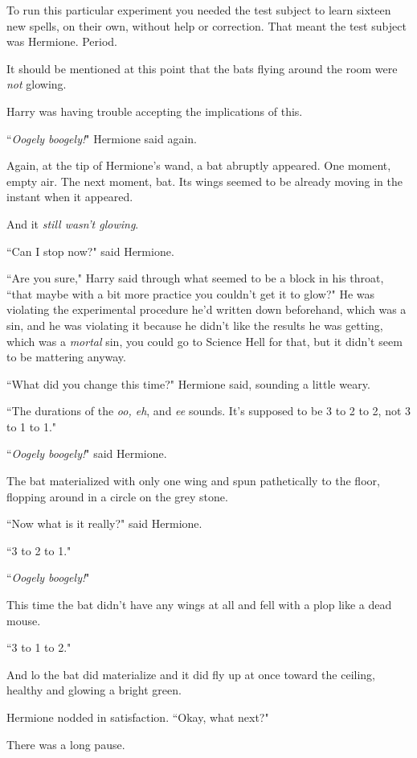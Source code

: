 To run this particular experiment you needed the test subject to learn sixteen new spells, on their own, without help or correction. That meant the test subject was Hermione. Period.

It should be mentioned at this point that the bats flying around the room were \emph{not} glowing.

Harry was having trouble accepting the implications of this.

``\emph{Oogely boogely!}" Hermione said again.

Again, at the tip of Hermione's wand, a bat abruptly appeared. One moment, empty air. The next moment, bat. Its wings seemed to be already moving in the instant when it appeared.

And it \emph{still wasn't glowing}.

``Can I stop now?" said Hermione.

``Are you sure," Harry said through what seemed to be a block in his throat, ``that maybe with a bit more practice you couldn't get it to glow?" He was violating the experimental procedure he'd written down beforehand, which was a sin, and he was violating it because he didn't like the results he was getting, which was a \emph{mortal} sin, you could go to Science Hell for that, but it didn't seem to be mattering anyway.

``What did you change this time?" Hermione said, sounding a little weary.

``The durations of the \emph{oo, eh}, and \emph{ee} sounds. It's supposed to be 3 to 2 to 2, not 3 to 1 to 1."

``\emph{Oogely boogely!}" said Hermione.

The bat materialized with only one wing and spun pathetically to the floor, flopping around in a circle on the grey stone.

``Now what is it really?" said Hermione.

``3 to 2 to 1."

``\emph{Oogely boogely!}"

This time the bat didn't have any wings at all and fell with a plop like a dead mouse.

``3 to 1 to 2."

And lo the bat did materialize and it did fly up at once toward the ceiling, healthy and glowing a bright green.

Hermione nodded in satisfaction. ``Okay, what next?"

There was a long pause.

